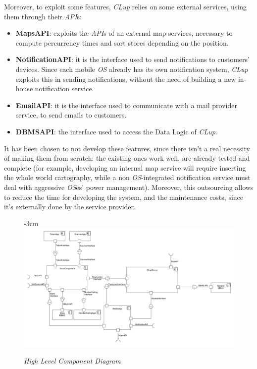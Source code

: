 \documentclass{article}
\begin{document}
		Moreover, to exploit some features, \emph{CLup} relies on some external services, using them through their \emph{API}s:
		
		\begin{itemize}
			\item {\bfseries MapsAPI}: exploits the \emph{API}s of an external map services, necessary to compute percurrency times and sort stores depending on the position.
			
			\item {\bfseries NotificationAPI}: it is the interface used to send notifications to customers’ devices. Since each mobile \emph{OS} already has its own notification system, \emph{CLup} exploits this in sending notifications, without the need of building a new in-house notification service.
			
			\item {\bfseries EmailAPI}: it is the interface used to communicate with a mail provider service, to send emails to customers.
			
			\item {\bfseries DBMSAPI}: the interface used to access the Data Logic of \emph{CLup}.
		\end{itemize}
	
		It has been chosen to not develop these features, since there isn’t a real necessity of making them from scratch: the existing ones work well, are already tested and complete (for example, developing an internal map service will require inserting the whole world cartography, while a non \emph{OS}-integrated notification service must deal with aggressive \emph{OS}es’ power management). Moreover, this outsourcing allows to reduce the time for developing the system, and the maintenance costs, since it’s externally done by the service provider.

		\begin{figure}
			\begin{adjustwidth} {-3cm}{}
				\centering
				\includegraphics[scale=0.35, angle=90, trim= 0 0 0 -5cm]{Component Diagrams/HighLevelComponentDiagram.pdf}\\
			\end{adjustwidth}
			\caption{\emph{High Level Component Diagram}}
		\end{figure}
		\newpage
\end{document}
